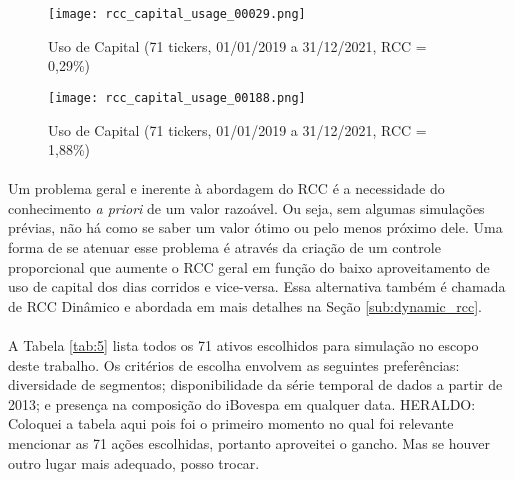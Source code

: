 \begin{figure}[!htb] %
    \texttt{[image: rcc\_capital\_usage\_00029.png]}
    \centering
    \caption{Uso de Capital (71 tickers, 01/01/2019 a 31/12/2021, RCC = 0,29\%)}
    \label{fig:551}
\end{figure}

\begin{figure}[!htb] %
    \texttt{[image: rcc\_capital\_usage\_00188.png]}
    \centering
    \caption{Uso de Capital (71 tickers, 01/01/2019 a 31/12/2021, RCC = 1,88\%)}
    \label{fig:552}
\end{figure}

\paragraph{} Um problema geral e inerente à abordagem do RCC é a necessidade do conhecimento \textit{a priori} de um valor razoável. Ou seja, sem algumas simulações prévias, não há como se saber um valor ótimo ou pelo menos próximo dele. Uma forma de se atenuar esse problema é através da criação de um controle proporcional que aumente o RCC geral em função do baixo aproveitamento de uso de capital dos dias corridos e vice-versa. Essa alternativa também é chamada de RCC Dinâmico e abordada em mais detalhes na Seção \ref{sub:dynamic_rcc}.


\paragraph{} A Tabela \ref{tab:5} lista todos os 71 ativos escolhidos para simulação no escopo deste trabalho. Os critérios de escolha envolvem as seguintes preferências: diversidade de segmentos; disponibilidade da série temporal de dados a partir de 2013; e presença na composição do iBovespa em qualquer data. \color{red} HERALDO: Coloquei a tabela aqui pois foi o primeiro momento no qual foi relevante mencionar as 71 ações escolhidas, portanto aproveitei o gancho. Mas se houver outro lugar mais adequado, posso trocar. 


